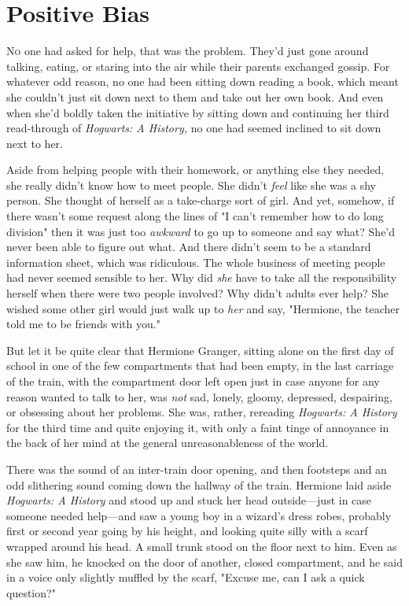 \chapter{Positive Bias}

\lettrine{N}{o} one had asked for help, that was the problem. They'd just gone around
talking, eating, or staring into the air while their parents exchanged gossip.
For whatever odd reason, no one had been sitting down reading a book, which
meant she couldn't just sit down next to them and take out her own book. And
even when she'd boldly taken the initiative by sitting down and continuing her
third read-through of \emph{Hogwarts: A History,} no one had seemed inclined to
sit down next to her.

Aside from helping people with their homework, or anything else they needed,
she really didn't know how to meet people. She didn't \emph{feel} like she was
a shy person. She thought of herself as a take-charge sort of girl. And yet,
somehow, if there wasn't some request along the lines of "I can't remember how
to do long division" then it was just too \emph{awkward} to go up to someone
and say{\el} what? She'd never been able to figure out what. And there
didn't seem to be a standard information sheet, which was ridiculous. The whole
business of meeting people had never seemed sensible to her. Why did \emph{she}
have to take all the responsibility herself when there were two people
involved? Why didn't adults ever help? She wished some other girl would just
walk up to \emph{her} and say, "Hermione, the teacher told me to be friends
with you."

But let it be quite clear that Hermione Granger, sitting alone on the first day
of school in one of the few compartments that had been empty, in the last
carriage of the train, with the compartment door left open just in case anyone
for any reason wanted to talk to her, was \emph{not} sad, lonely, gloomy,
depressed, despairing, or obsessing about her problems. She was, rather,
rereading \emph{Hogwarts: A History} for the third time and quite enjoying it,
with only a faint tinge of annoyance in the back of her mind at the general
unreasonableness of the world.

There was the sound of an inter-train door opening, and then footsteps and an
odd slithering sound coming down the hallway of the train. Hermione laid aside
\emph{Hogwarts: A History} and stood up and stuck her head outside—just in
case someone needed help—and saw a young boy in a wizard's dress robes,
probably first or second year going by his height, and looking quite silly with
a scarf wrapped around his head. A small trunk stood on the floor next to him.
Even as she saw him, he knocked on the door of another, closed compartment, and
he said in a voice only slightly muffled by the scarf, "Excuse me, can I ask a
quick question?"

